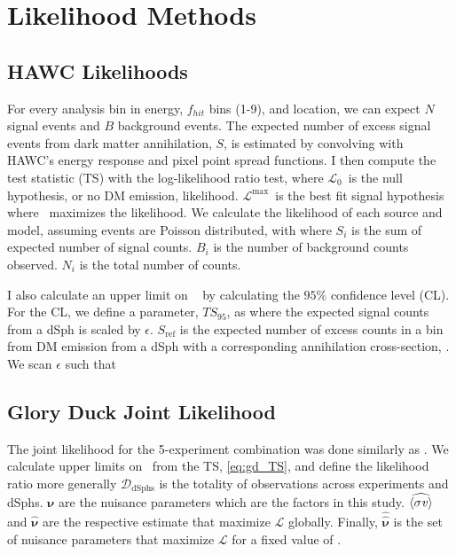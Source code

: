 


\section{Likelihood Methods} \label{sec:gd_ll_methods}

\subsection{HAWC Likelihoods}\label{sec:gd_hawc_llh}

For every analysis bin in energy, $f_{hit}$ bins (1-9), and location, we can expect $N$ signal events and $B$ background events.
The expected number of excess signal events from dark matter annihilation, $S$, is estimated by convolving  with HAWC's energy response and pixel point spread functions.
I then compute the test statistic (TS) with the log-likelihood ratio test,
\gdTS
where $\mathcal{L}_0$~is the null hypothesis, or no DM emission, likelihood.
$\mathcal{L}^\mathrm{max}$~is the best fit signal hypothesis where \sv~maximizes the likelihood.
We calculate the likelihood of each source and model, assuming events are Poisson distributed, with
\hwcpsLLH
where $S_i$ is the sum of expected number of signal counts.
$B_i$ is the number of background counts observed.
$N_i$ is the total number of counts.

I also calculate an upper limit on \sv~ by calculating the $95\%$ confidence level (CL).
For the CL, we define a parameter, $TS_{95}$, as
\gdHAWCCL
where the expected signal counts from a dSph is scaled by $\epsilon$.
$S_\mathrm{ref}$ is the expected number of excess counts in a bin from DM emission from a dSph with a corresponding annihilation cross-section, \sv.
We scan $\epsilon$ such that
\CLbyTS

\subsection{Glory Duck Joint Likelihood}\label{sec:gd_joint_llh}

The joint likelihood for the 5-experiment combination was done similarly as .
We calculate upper limits on \sv~from the TS, \cref{eq:gd_TS}, and define the likelihood ratio more generally
\gdLHratio
$\bm{\mathcal{D}_{\mathrm{dSphs}}}$ is the totality of observations across experiments and dSphs.
$\bm{\nu}$ are the nuisance parameters which are the \J factors in this study.
$\widehat{\langle \sigma \mathit{v} \rangle}$ and $\hat{\bm{\nu}}$ are the respective estimate that maximize $\mathcal{L}$ globally.
Finally, $\hat{\hat{\bm{\nu}}}$ is the set of nuisance parameters that maximize $\mathcal{L}$ for a fixed value of \sv.

